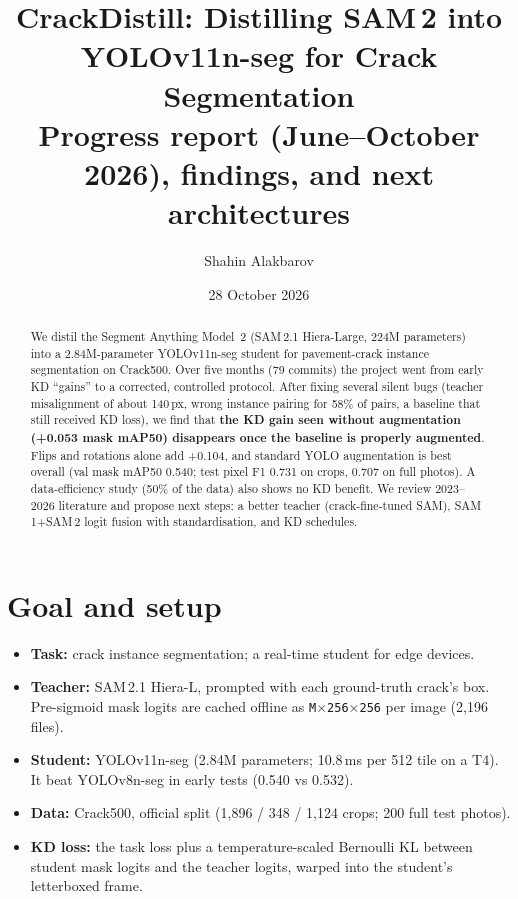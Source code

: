 \documentclass[11pt,a4paper]{article}
\title{\textbf{CrackDistill: Distilling SAM\,2 into YOLOv11n-seg for Crack Segmentation}\\[2pt]
\large Progress report (June--October 2026), findings, and next architectures}
\author{Shahin Alakbarov}
\date{28 October 2026}
\begin{document}
\maketitle

\begin{abstract}
We distil the Segment Anything Model~2 (SAM\,2.1 Hiera-Large, 224M parameters) into a 2.84M-parameter
YOLOv11n-seg student for pavement-crack instance segmentation on Crack500. Over five months (79 commits) the
project went from early KD ``gains'' to a corrected, controlled protocol. After fixing several silent bugs
(teacher misalignment of about 140\,px, wrong instance pairing for 58\% of pairs, a baseline that still
received KD loss), we find that \textbf{the KD gain seen without augmentation (+0.053 mask mAP50) disappears once the
baseline is properly augmented}. Flips and rotations alone add +0.104, and standard YOLO augmentation is best
overall (val mask mAP50 0.540; test pixel F1 0.731 on crops, 0.707 on full photos). A data-efficiency study
(50\% of the data) also shows no KD benefit. We review 2023--2026 literature and propose next steps: a better
teacher (crack-fine-tuned SAM), SAM\,1+SAM\,2 logit fusion with standardisation, and KD schedules.
\end{abstract}

\section{Goal and setup}
\begin{itemize}
\item \textbf{Task:} crack instance segmentation; a real-time student for edge devices.
\item \textbf{Teacher:} SAM\,2.1 Hiera-L, prompted with each ground-truth crack's box. Pre-sigmoid mask logits are
cached offline as \texttt{M$\times$256$\times$256} per image (2,196 files).
\item \textbf{Student:} YOLOv11n-seg (2.84M parameters; 10.8\,ms per 512 tile on a T4). It beat YOLOv8n-seg in early tests (0.540 vs 0.532).
\item \textbf{Data:} Crack500, official split (1,896 / 348 / 1,124 crops; 200 full test photos).
\item \textbf{KD loss:} the task loss plus a temperature-scaled Bernoulli KL between student mask logits and the
teacher logits, warped into the student's letterboxed frame.
\end{itemize}
\end{document}
